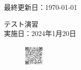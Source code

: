 \documentclass[a4paper,11pt]{jsarticle}
\begin{document}
\begin{titlepage}
  \hfill {最終更新日：\today}
  \begin{center}
    {\Huge\gt テスト演習}\\ \vspace{\baselineskip}
    \textup{\large 実施日：2024年1月20日}\\ 
  \end{center}
  \vfill
  \begin{figure}[H]
    \includegraphics[width=0.1\textwidth]{../images/qrcode.png}
  \end{figure}
\end{titlepage}

\qPart

\calcPage

\qPart

\calcPage

\qPart

\clearpage

\brankPage
\end{document}
